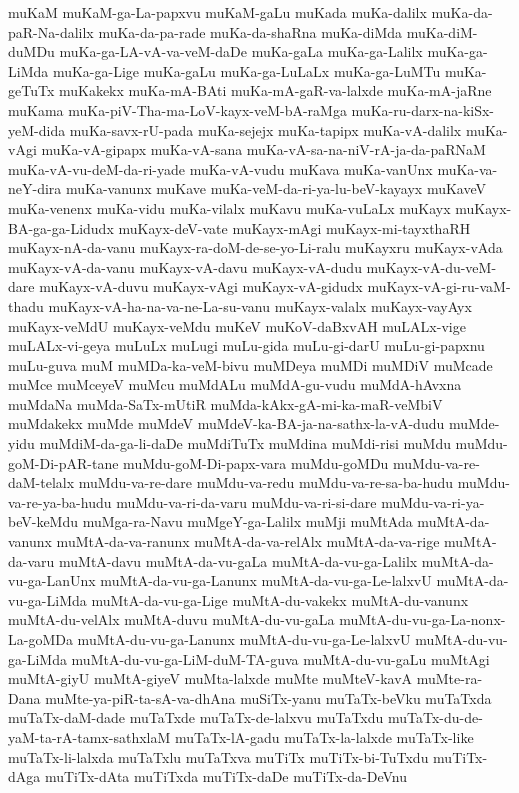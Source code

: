 {muKaM
muKaM-ga-La-papxvu
muKaM-gaLu
muKada
muKa-dalilx
muKa-da-paR-Na-dalilx
muKa-da-pa-rade
muKa-da-shaRna
muKa-diMda
muKa-diM-duMDu
muKa-ga-LA-vA-va-veM-daDe
muKa-gaLa
muKa-ga-Lalilx
muKa-ga-LiMda
muKa-ga-Lige
muKa-gaLu
muKa-ga-LuLaLx
muKa-ga-LuMTu
muKa-geTuTx
muKakekx
muKa-mA-BAti
muKa-mA-gaR-va-lalxde
muKa-mA-jaRne
muKama
muKa-piV-Tha-ma-LoV-kayx-veM-bA-raMga
muKa-ru-darx-na-kiSx-yeM-dida
muKa-savx-rU-pada
muKa-sejejx
muKa-tapipx
muKa-vA-dalilx
muKa-vAgi
muKa-vA-gipapx
muKa-vA-sana
muKa-vA-sa-na-niV-rA-ja-da-paRNaM
muKa-vA-vu-deM-da-ri-yade
muKa-vA-vudu
muKava
muKa-vanUnx
muKa-va-neY-dira
muKa-vanunx
muKave
muKa-veM-da-ri-ya-lu-beV-kayayx
muKaveV
muKa-venenx
muKa-vidu
muKa-vilalx
muKavu
muKa-vuLaLx
muKayx
muKayx-BA-ga-ga-Lidudx
muKayx-deV-vate
muKayx-mAgi
muKayx-mi-tayxthaRH
muKayx-nA-da-vanu
muKayx-ra-doM-de-se-yo-Li-ralu
muKayxru
muKayx-vAda
muKayx-vA-da-vanu
muKayx-vA-davu
muKayx-vA-dudu
muKayx-vA-du-veM-dare
muKayx-vA-duvu
muKayx-vAgi
muKayx-vA-gidudx
muKayx-vA-gi-ru-vaM-thadu
muKayx-vA-ha-na-va-ne-La-su-vanu
muKayx-valalx
muKayx-vayAyx
muKayx-veMdU
muKayx-veMdu
muKeV
muKoV-daBxvAH
muLALx-vige
muLALx-vi-geya
muLuLx
muLugi
muLu-gida
muLu-gi-darU
muLu-gi-papxnu
muLu-guva
muM
muMDa-ka-veM-bivu
muMDeya
muMDi
muMDiV
muMcade
muMce
muMceyeV
muMcu
muMdALu
muMdA-gu-vudu
muMdA-hAvxna
muMdaNa
muMda-SaTx-mUtiR
muMda-kAkx-gA-mi-ka-maR-veMbiV
muMdakekx
muMde
muMdeV
muMdeV-ka-BA-ja-na-sathx-la-vA-dudu
muMde-yidu
muMdiM-da-ga-li-daDe
muMdiTuTx
muMdina
muMdi-risi
muMdu
muMdu-goM-Di-pAR-tane
muMdu-goM-Di-papx-vara
muMdu-goMDu
muMdu-va-re-daM-telalx
muMdu-va-re-dare
muMdu-va-redu
muMdu-va-re-sa-ba-hudu
muMdu-va-re-ya-ba-hudu
muMdu-va-ri-da-varu
muMdu-va-ri-si-dare
muMdu-va-ri-ya-beV-keMdu
muMga-ra-Navu
muMgeY-ga-Lalilx
muMji
muMtAda
muMtA-da-vanunx
muMtA-da-va-ranunx
muMtA-da-va-relAlx
muMtA-da-va-rige
muMtA-da-varu
muMtA-davu
muMtA-da-vu-gaLa
muMtA-da-vu-ga-Lalilx
muMtA-da-vu-ga-LanUnx
muMtA-da-vu-ga-Lanunx
muMtA-da-vu-ga-Le-lalxvU
muMtA-da-vu-ga-LiMda
muMtA-da-vu-ga-Lige
muMtA-du-vakekx
muMtA-du-vanunx
muMtA-du-velAlx
muMtA-duvu
muMtA-du-vu-gaLa
muMtA-du-vu-ga-La-nonx-La-goMDa
muMtA-du-vu-ga-Lanunx
muMtA-du-vu-ga-Le-lalxvU
muMtA-du-vu-ga-LiMda
muMtA-du-vu-ga-LiM-duM-TA-guva
muMtA-du-vu-gaLu
muMtAgi
muMtA-giyU
muMtA-giyeV
muMta-lalxde
muMte
muMteV-kavA
muMte-ra-Dana
muMte-ya-piR-ta-sA-va-dhAna
muSiTx-yanu
muTaTx-beVku
muTaTxda
muTaTx-daM-dade
muTaTxde
muTaTx-de-lalxvu
muTaTxdu
muTaTx-du-de-yaM-ta-rA-tamx-sathxlaM
muTaTx-lA-gadu
muTaTx-la-lalxde
muTaTx-like
muTaTx-li-lalxda
muTaTxlu
muTaTxva
muTiTx
muTiTx-bi-TuTxdu
muTiTx-dAga
muTiTx-dAta
muTiTxda
muTiTx-daDe
muTiTx-da-DeVnu
}
